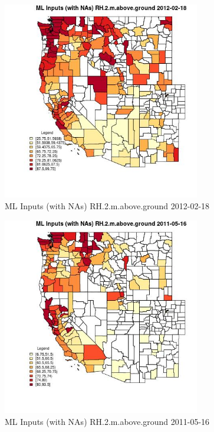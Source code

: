 \begin{figure} 
\centering  
\includegraphics[width=0.77\textwidth]{Code_Outputs/Report_ML_input_PM25_Step4_part_f_de_duplicated_aveswNAs_CountyRH2mabovegroundMean2012-02-18.jpg} 
\caption{\label{fig:Report_ML_input_PM25_Step4_part_f_de_duplicated_aveswNAsCountyRH2mabovegroundMean2012-02-18}ML Inputs (with NAs) RH.2.m.above.ground 2012-02-18} 
\end{figure} 
 

\begin{figure} 
\centering  
\includegraphics[width=0.77\textwidth]{Code_Outputs/Report_ML_input_PM25_Step4_part_f_de_duplicated_aveswNAs_CountyRH2mabovegroundMean2011-05-16.jpg} 
\caption{\label{fig:Report_ML_input_PM25_Step4_part_f_de_duplicated_aveswNAsCountyRH2mabovegroundMean2011-05-16}ML Inputs (with NAs) RH.2.m.above.ground 2011-05-16} 
\end{figure} 
 


